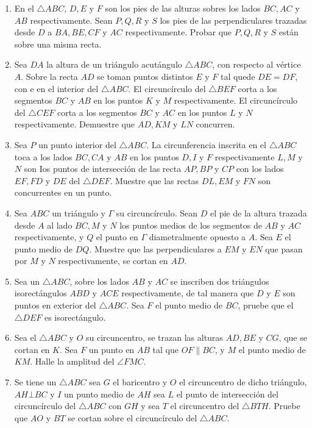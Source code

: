 \documentclass{book}
\begin{document}
\begin{enumerate}
    \item En el $\triangle ABC$, $D ,E$ y $F$ son los pies de las alturas sobres los lados $BC,AC$ y $AB$ respectivamente. Sean $P,Q,R$ y $S$ los pies de las perpendiculares trazadas desde $D$ a $BA, BE, CF$ y $AC$ respectivamente. Probar que $P, Q, R$ y $S$ están sobre una misma recta.
    \item Sea $DA$ la altura de un triángulo acutángulo $\triangle ABC$, con respecto al vértice $A$. Sobre la recta $AD$ se toman puntos distintos $E$ y $F$ tal quede $DE=DF$, con e en el interior del $\triangle ABC$. El circuncírculo del $\triangle BEF$ corta a los segmentos $BC$ y $AB$ en los puntos $K$ y $M$ respectivamente. El circuncírculo del $\triangle CEF$ corta a los segmentos $BC$ y $AC$ en los puntos $L$ y $N$ respectivamente. Demuestre que $AD, KM$ y $LN$ concurren.
    \item Sea $P$ un punto interior del $\triangle ABC$. La circunferencia inscrita en el $\triangle ABC$ toca a los lados $BC,CA$ y $AB$ en los puntos $D,I$ y $F$ respectivamente $L,M$ y $N$ son Ios puntos de intersección de las recta $AP,BP$ y $CP$ con los lados $EF,FD$ y $DE$ del $\triangle DEF$. Muestre que las rectas $DL,EM$ y $FN$ son concurrentes en un punto.
    \item Sea $ABC$ un triángulo y $\Gamma$ su circuncírculo. Sean $D$ el pie de la altura trazada desde $A$ al lado $BC, M$ y $N$ los puntos medios de los segmentos de $AB$ y $AC$ respectivamente, y $Q$ el punto en $\Gamma$ diametralmente opuesto a $A$. Sea $E$ el punto medio de $DQ$. Muestre que las perpendiculares a $EM$ y $EN$ que pasan por $M$ y $N$ respectivamente, se cortan en $AD$.
    \item Sea un $\triangle ABC$, sobre los lados $AB$ y $AC$ se inscriben dos triángulos isorectángulos $ABD$ y $ACE$ respectivamente, de tal manera que $D$ y $E$ son puntos en exterior del $\triangle ABC$. Sea $F$ el punto medio de $BC$, pruebe que el $\triangle DEF$ es isorectángulo.
    \item Sea el $\triangle ABC$  y $O$ su circuncentro, se trazan las alturas $AD, BE$ y $CG$, que se cortan en $K$. Sea $F$ un punto en $AB$ tal que $OF \| BC$, y $M$ el punto medio de $KM$. Halle la amplitud del $\angle FMC$.
    \item Se tiene un $\triangle ABC$ sea $G$ el baricentro y $O$ el circuncentro de dicho triángulo, $AH \bot BC$ y $I$ un punto medio de $AH$ sea $L$ el punto de intersección del circuncírculo del $\triangle ABC$ con $GH$ y sea $T$ el circuncentro del $\triangle BTH$. Pruebe que $AO$ y $BT$ se cortan sobre el circuncírculo del $\triangle ABC$.

\end{enumerate}
\end{document}
